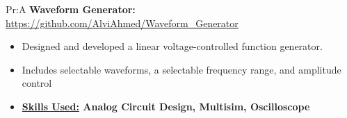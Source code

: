 
Pr:A
\textbf{Waveform Generator: }
\underline{\url{https://github.com/AlviAhmed/Waveform_Generator}}
\begin{itemize}[noitemsep,nolistsep]
\item Designed and developed a linear voltage-controlled function generator. 
\item Includes selectable waveforms, a selectable frequency range, and amplitude control
\item \textbf{ \underline{Skills Used:} Analog Circuit Design, Multisim, Oscilloscope}
\end{itemize}            

